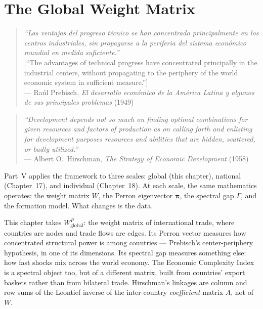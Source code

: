 \documentclass[../structural_economics_book.tex]{subfiles}
\begin{document}
\ifSubfilesClassLoaded{\setcounter{chapter}{15}}{}
\chapter{The Global Weight Matrix}\label{ch:16}
\begin{quote}
\textit{``Las ventajas del progreso t\'{e}cnico se han concentrado principalmente en los centros industriales, sin propagarse a la periferia del sistema econ\'{o}mico mundial en medida suficiente.''}\\[0.3em]
\textnormal{[``The advantages of technical progress have concentrated principally in the industrial centers, without propagating to the periphery of the world economic system in sufficient measure.'']}\\
\hfill --- Ra\'{u}l Prebisch, \textit{El desarrollo econ\'{o}mico de la Am\'{e}rica Latina y algunos de sus principales problemas} (1949)
\end{quote}
\nocite{prebisch1949desarrollo}

\vspace{0.3em}

\begin{quote}
\textit{``Development depends not so much on finding optimal combinations for given resources and factors of production as on calling forth and enlisting for development purposes resources and abilities that are hidden, scattered, or badly utilized.''}\\
\hfill --- Albert O.\ Hirschman, \textit{The Strategy of Economic Development} (1958)
\end{quote}
\nocite{hirschman1958strategy}

\vspace{1em}

Part~V applies the framework to three scales: global (this chapter), national (Chapter~17), and individual (Chapter~18). At each scale, the same mathematics operates: the weight matrix $W$, the Perron eigenvector $\boldsymbol{\pi}$, the spectral gap $\Gamma$, and the formation model. What changes is the data.

This chapter takes $W^P_{\text{global}}$: the weight matrix of international trade, where countries are nodes and trade flows are edges. Its Perron vector measures how concentrated structural power is among countries --- Prebisch's center-periphery hypothesis, in one of its dimensions. Its spectral gap measures something else: how fast shocks mix across the world economy. The Economic Complexity Index \citep{hidalgo2009building} is a spectral object too, but of a different matrix, built from countries' export baskets rather than from bilateral trade. Hirschman's linkages are column and row sums of the Leontief inverse of the inter-country \emph{coefficient} matrix $A$, not of $W$.
\end{document}
